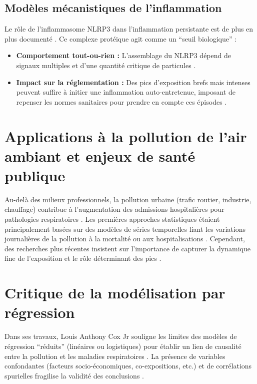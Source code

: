 \subsection{Modèles mécanistiques de l’inflammation}
Le rôle de l’inflammasome NLRP3 dans l’inflammation persistante est de plus en plus documenté \citep{Donaldson2010,Sayan2016}. Ce complexe protéique agit comme un ``seuil biologique'' :
\begin{itemize}
    \item \textbf{Comportement tout-ou-rien :} L'assemblage du NLRP3 dépend de signaux multiples et d'une quantité critique de particules \citep{Groslambert2018}.
    \item \textbf{Impact sur la réglementation :} Des pics d'exposition brefs mais intenses peuvent suffire à initier une inflammation auto-entretenue, imposant de repenser les normes sanitaires pour prendre en compte ces épisodes \citep{Cox2019}.
\end{itemize}

\section{Applications à la pollution de l’air ambiant et enjeux de santé publique}
Au-delà des milieux professionnels, la pollution urbaine (trafic routier, industrie, chauffage) contribue à l’augmentation des admissions hospitalières pour pathologies respiratoires \citep{Cho2011,Gomes2014}. Les premières approches statistiques étaient principalement basées sur des modèles de séries temporelles liant les variations journalières de la pollution à la mortalité ou aux hospitalisations \citep{Kim2003,Cox1996}. Cependant, des recherches plus récentes insistent sur l’importance de capturer la dynamique fine de l'exposition et le rôle déterminant des pics \citep{Gottschalk2016,Sayan2016}.

\section{Critique de la modélisation par régression}
\label{sec:RegressionCriticism}
Dans ses travaux, Louis Anthony Cox Jr souligne les limites des modèles de régression ``réduits'' (linéaires ou logistiques) pour établir un lien de causalité entre la pollution et les maladies respiratoires \citep{cox2021quantitative}. La présence de variables confondantes (facteurs socio-économiques, co-expositions, etc.) et de corrélations spurielles fragilise la validité des conclusions \citep{Cui2003,Sneeringer2009,Selvin1984}.

